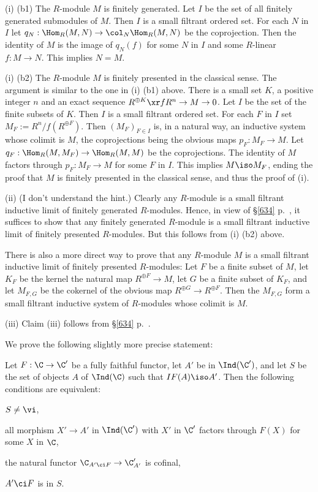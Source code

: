 \documentclass[12pt]{article}
\theoremstyle{remark}
\theoremstyle{definition}
\begin{document}
\nn(i) (b1) The $R$-module $M$ is finitely generated. Let $I$ be the set of all finitely generated submodules of $M$. Then $I$ is a small filtrant ordered set. For each $N$ in $I$ let $q_N:\Hom_R(M,N)\to\col_N\Hom_R(M,N)$ be the coprojection. Then the identity of $M$ is the image of $q_N(f)$ for some $N$ in $I$ and some $R$-linear $f:M\to N$. This implies $N=M$. 

\nn(i) (b2) The $R$-module $M$ is finitely presented in the classical sense. The argument is similar to the one in (i) (b1) above. There is a small set $K$, a positive integer $n$ and an exact sequence $R^{\oplus K}\xr f R^n\to M\to0$. Let $I$ be the set of the finite subsets of $K$. Then $I$ is a small filtrant ordered set. For each $F$ in $I$ set $M_F:=R^n/f(R^{\oplus F})$. Then $(M_F)_{F\in I}$ is, in a natural way, an inductive system whose colimit is $M$, the coprojections being the obvious maps $p_F:M_F\to M$. Let $q_F:\Hom_R(M,M_F)\to\Hom_R(M,M)$ be the coprojections. The identity of $M$ factors through $p_F:M_F\to M$ for some $F$ in $I$. This implies $M\iso M_F$, ending the proof that $M$ is finitely presented in the classical sense, and thus the proof of (i).

\nn(ii) (I don't understand the hint.) Clearly any $R$-module is a small filtrant inductive limit of finitely generated $R$-modules. Hence, in view of \S\ref{634} p.~, it suffices to show that any finitely generated $R$-module is a small filtrant inductive limit of finitely presented $R$-modules. But this follows from (i) (b2) above.

There is also a more direct way to prove that any $R$-module $M$ is a small filtrant inductive limit of finitely presented $R$-modules: Let $F$ be a finite subset of $M$, let $K_F$ be the kernel the natural map $R^{\oplus F}\to M$, let $G$ be a finite subset of $K_F$, and let $M_{F,G}$ be the cokernel of the obvious map $R^{\oplus G}\to R^{\oplus F}$. Then the $M_{F,G}$ form a small filtrant inductive system of $R$-modules whose colimit is $M$.

\nn(iii) Claim (iii) follows from \S\ref{634} p.~. %



We prove the following slightly more precise statement:

\begin{prop}
Let $F:\C\to\C'$ be a fully faithful functor, let $A'$ be in $\Ind(\C')$, and let $S$ be the set of objects $A$ of $\Ind(\C)$ such that $IF(A)\iso A'$. Then the following conditions are equivalent: 

 $S\neq\vi$, 

 all morphism $X'\to A'$ in $\Ind(\C')$ with $X'$ in $\C'$ factors through $F(X)$ for some $X$ in $\C$, 

 the natural functor $\C_{A'\ci F}\to\C'_{A'}$ is cofinal, 

 $A'\ci F$ is in $S$.
\end{prop}
\end{document}
